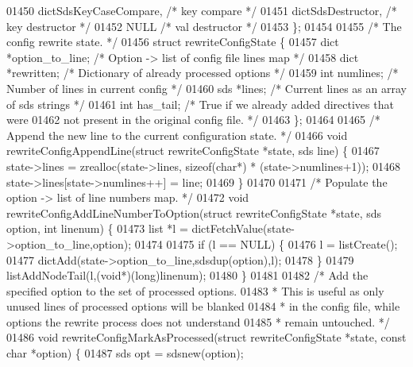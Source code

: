\begin{DoxyCode}
{{{{{{{{{{{{{{01450     dictSdsKeyCaseCompare,      \textcolor{comment}{/* key compare */}
01451     dictSdsDestructor,          \textcolor{comment}{/* key destructor */}
01452     NULL                        \textcolor{comment}{/* val destructor */}
01453 \};
01454 
01455 \textcolor{comment}{/* The config rewrite state. */}
01456 \textcolor{keyword}{struct} rewriteConfigState \{
01457     dict *option\_to\_line; \textcolor{comment}{/* Option -> list of config file lines map */}
01458     dict *rewritten;      \textcolor{comment}{/* Dictionary of already processed options */}
01459     \textcolor{keywordtype}{int} numlines;         \textcolor{comment}{/* Number of lines in current config */}
01460     sds *lines;           \textcolor{comment}{/* Current lines as an array of sds strings */}
01461     \textcolor{keywordtype}{int} has\_tail;         \textcolor{comment}{/* True if we already added directives that were}
01462 \textcolor{comment}{                             not present in the original config file. */}
01463 \};
01464 
01465 \textcolor{comment}{/* Append the new line to the current configuration state. */}
01466 \textcolor{keywordtype}{void} rewriteConfigAppendLine(\textcolor{keyword}{struct} rewriteConfigState *state, sds line) \{
01467     state->lines = zrealloc(state->lines, \textcolor{keyword}{sizeof}(\textcolor{keywordtype}{char}*) * (state->numlines+1));
01468     state->lines[state->numlines++] = line;
01469 \}
01470 
01471 \textcolor{comment}{/* Populate the option -> list of line numbers map. */}
01472 \textcolor{keywordtype}{void} rewriteConfigAddLineNumberToOption(\textcolor{keyword}{struct} rewriteConfigState *state, sds option, \textcolor{keywordtype}{int} linenum) \{
01473     list *l = dictFetchValue(state->option\_to\_line,option);
01474 
01475     \textcolor{keywordflow}{if} (l == NULL) \{
01476         l = listCreate();
01477         dictAdd(state->option\_to\_line,sdsdup(option),l);
01478     \}
01479     listAddNodeTail(l,(\textcolor{keywordtype}{void}*)(\textcolor{keywordtype}{long})linenum);
01480 \}
01481 
01482 \textcolor{comment}{/* Add the specified option to the set of processed options.}
01483 \textcolor{comment}{ * This is useful as only unused lines of processed options will be blanked}
01484 \textcolor{comment}{ * in the config file, while options the rewrite process does not understand}
01485 \textcolor{comment}{ * remain untouched. */}
01486 \textcolor{keywordtype}{void} rewriteConfigMarkAsProcessed(\textcolor{keyword}{struct} rewriteConfigState *state, \textcolor{keyword}{const} \textcolor{keywordtype}{char} *option) \{
01487     sds opt = sdsnew(option);
}}}}}}}}}}}}}}
\end{DoxyCode}
